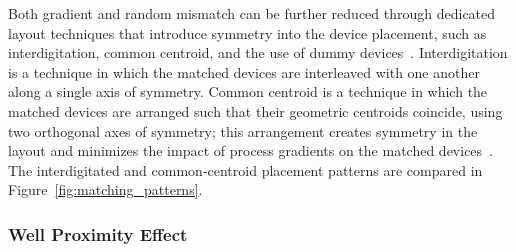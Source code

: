 Both gradient and random mismatch can be further reduced through dedicated layout techniques that introduce symmetry into the device placement, such as interdigitation, common centroid, and the use of dummy devices~\cite{ndjountche2011_highspeed}. Interdigitation is a technique in which the matched devices are interleaved with one another along a single axis of symmetry. Common centroid is a technique in which the matched devices are arranged such that their geometric centroids coincide, using two orthogonal axes of symmetry; this arrangement creates symmetry in the layout and minimizes the impact of process gradients on the matched devices~\cite{razavi, layout_fundamentals}.
The interdigitated and common-centroid placement patterns are compared in Figure~\ref{fig:matching_patterns}.

\subsubsection{Well Proximity Effect}\label{sec:well_proximity_effect}

